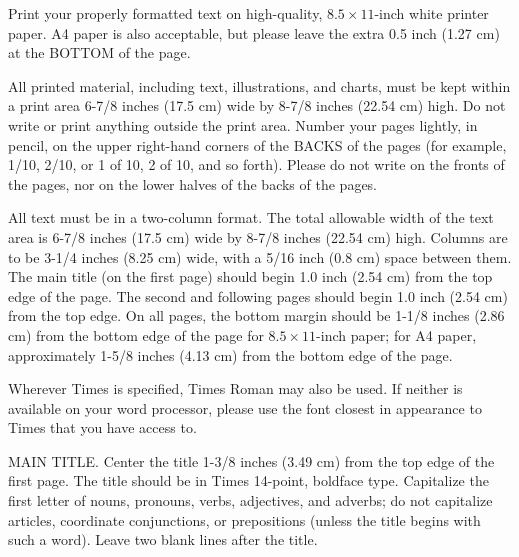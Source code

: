 \documentclass[times, 10pt,twocolumn]{article}
\begin{document}

Print your properly formatted text on high-quality, $8.5 \times 11$-inch 
white printer paper. A4 paper is also acceptable, but please leave the 
extra 0.5 inch (1.27 cm) at the BOTTOM of the page.


All printed material, including text, illustrations, and charts, must be 
kept within a print area 6-7/8 inches (17.5 cm) wide by 8-7/8 inches 
(22.54 cm) high. Do not write or print anything outside the print area. 
Number your pages lightly, in pencil, on the upper right-hand corners of 
the BACKS of the pages (for example, 1/10, 2/10, or 1 of 10, 2 of 10, and 
so forth). Please do not write on the fronts of the pages, nor on the 
lower halves of the backs of the pages.



All text must be in a two-column format. The total allowable width of 
the text area is 6-7/8 inches (17.5 cm) wide by 8-7/8 inches (22.54 cm) 
high. Columns are to be 3-1/4 inches (8.25 cm) wide, with a 5/16 inch 
(0.8 cm) space between them. The main title (on the first page) should 
begin 1.0 inch (2.54 cm) from the top edge of the page. The second and 
following pages should begin 1.0 inch (2.54 cm) from the top edge. On 
all pages, the bottom margin should be 1-1/8 inches (2.86 cm) from the 
bottom edge of the page for $8.5 \times 11$-inch paper; for A4 paper, 
approximately 1-5/8 inches (4.13 cm) from the bottom edge of the page.


Wherever Times is specified, Times Roman may also be used. If neither is 
available on your word processor, please use the font closest in 
appearance to Times that you have access to.

MAIN TITLE. Center the title 1-3/8 inches (3.49 cm) from the top edge of 
the first page. The title should be in Times 14-point, boldface type. 
Capitalize the first letter of nouns, pronouns, verbs, adjectives, and 
adverbs; do not capitalize articles, coordinate conjunctions, or 
prepositions (unless the title begins with such a word). Leave two blank 
lines after the title.
\end{document}
